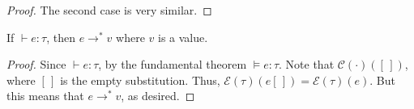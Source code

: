 \documentclass{lecturenotes}
\begin{document}
\begin{proof}
  The second case is very similar.
  
\end{proof}

\begin{cor}[Termination]
  If $\vdash e : \tau$, then $e \to^\ast v$ where $v$ is a value.
\end{cor}
\begin{proof}
  Since $\vdash e : \tau$, by the fundamental theorem $\vDash e : \tau$.
  Note that $\mathcal{C}(\cdot)([\,])$, where $[\,]$ is the empty substitution.
  Thus, $\mathcal{E}(\tau)(e[\,]) = \mathcal{E}(\tau)(e)$.
  But this means that $e \to^\ast v$, as desired.
\end{proof}
\end{document}
